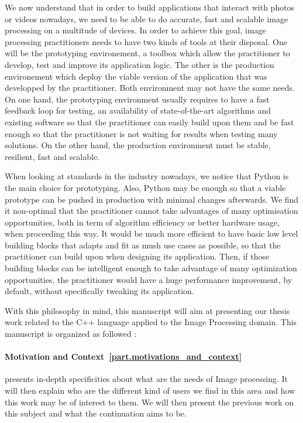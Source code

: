 We now understand that in order to build applications that interact with photos or videos nowadays, we need to be able
to do accurate, fast and scalable image processing on a multitude of devices. In order to achieve this goal, image
processing practitioners needs to have two kinds of tools at their disposal. One will be the prototyping environement, a
toolbox which allow the practitioner to develop, test and improve its application logic. The other is the production
environement which deploy the viable version of the application that was developped by the practitioner. Both
environment may not have the same needs. On one hand, the prototyping environment usually requires to have a fast
feedback loop for testing, an availability of state-of-the-art algorithms and existing software so that the practitioner
can easily build upon them and be fast enough so that the practitioner is not waiting for results when testing many
solutions. On the other hand, the production environment must be stable, resilient, fast and scalable.

When looking at standards in the industry nowadays, we notice that Python is the main choice for prototyping. Also,
Python may be enough so that a viable prototype can be pushed in production with minimal changes afterwards. We find it
non-optimal that the practitioner cannot take advantages of many optimisation opportunities, both in term of algorithm
efficiency or better hardware usage, when proceeding this way. It would be much more efficient to have basic low level
building blocks that adapts and fit as mush use cases as possible, so that the practitioner can build upon when
designing its application. Then, if those building blocks can be intelligent enough to take advantage of many
optimization opportunities, the practitioner would have a huge performance improvement, by default, without specifically
tweaking its application.

With this philosophy in mind, this manuscript will aim at presenting our thesis work related to the C++ language applied
to the Image Processing domain. This manuscript is organized as followed :

\paragraph{Motivation and Context~\ref{part.motivations_and_context}} presents in-depth specificities about what are the
needs of Image processing. It will then explain who are the different kind of users we find in this area and how this
work may be of interest to them. We will then present the previous work on this subject and what the continuation aims
to be.

